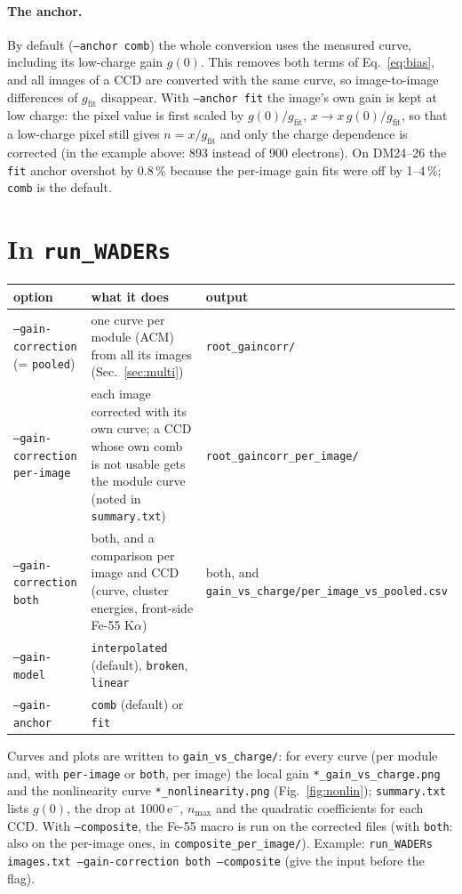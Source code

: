 \documentclass[11pt,a4paper]{article}
\newcommand{\code}[1]{\texttt{#1}}
\newcommand{\eminus}{e$^-$}
\newcommand{\gfit}{g_{\mathrm{fit}}}
\newcommand{\nmax}{n_{\mathrm{max}}}
\begin{document}
\paragraph{The anchor.} By default (\code{--anchor comb}) the whole conversion uses the measured curve,
including its low-charge gain $g(0)$. This removes both terms of Eq.~\ref{eq:bias}, and all images of a
CCD are converted with the same curve, so image-to-image differences of $\gfit$ disappear. With
\code{--anchor fit} the image's own gain is kept at low charge: the pixel value is first scaled by
$g(0)/\gfit$, $x \to x\,g(0)/\gfit$, so that a low-charge pixel still gives $n = x/\gfit$ and only the
charge dependence is corrected (in the example above: 893 instead of 900 electrons). On DM24--26 the
\code{fit} anchor overshot by 0.8\,\% because the per-image gain fits were off by 1--4\,\%; \code{comb}
is the default.

\section{In \code{run\_WADERs}}
\begin{center}
\begin{tabular}{p{4.3cm}p{6.7cm}p{4.2cm}}
\toprule
option & what it does & output \\
\midrule
\code{--gain-correction} (= \code{pooled}) & one curve per module (ACM) from all its images (Sec.~\ref{sec:multi}) & \code{root\_gaincorr/} \\
\code{--gain-correction per-image} & each image corrected with its own curve; a CCD whose own comb is not usable gets the module curve (noted in \code{summary.txt}) & \code{root\_gaincorr\_per\_image/} \\
\code{--gain-correction both} & both, and a comparison per image and CCD (curve, cluster energies, front-side Fe-55 K$\alpha$) & both, and \code{gain\_vs\_charge/per\_image\_vs\_pooled.csv} \\
\code{--gain-model} & \code{interpolated} (default), \code{broken}, \code{linear} & \\
\code{--gain-anchor} & \code{comb} (default) or \code{fit} & \\
\bottomrule
\end{tabular}
\end{center}
Curves and plots are written to \code{gain\_vs\_charge/}: for every curve (per module and, with
\code{per-image} or \code{both}, per image) the local gain \code{*\_gain\_vs\_charge.png} and the
nonlinearity curve \code{*\_nonlinearity.png} (Fig.~\ref{fig:nonlin}); \code{summary.txt} lists $g(0)$, the
drop at 1000\,\eminus, $\nmax$ and the quadratic coefficients for each CCD. With \code{--composite}, the
Fe-55 macro is run on the corrected files (with \code{both}: also on the per-image ones, in
\code{composite\_per\_image/}). Example: \code{run\_WADERs images.txt --gain-correction both --composite}
(give the input before the flag).
\end{document}
